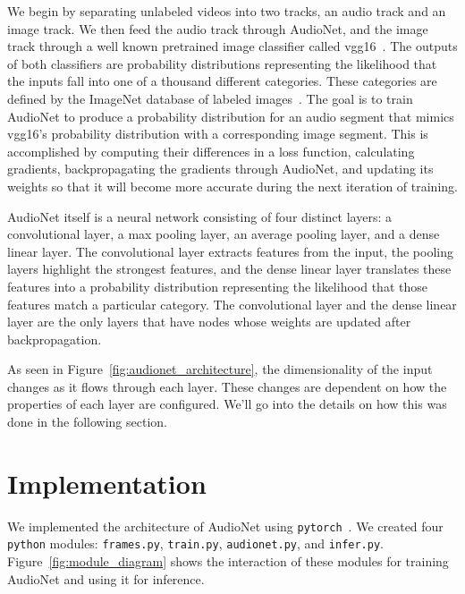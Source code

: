 \documentclass[12pt,twoside]{article}
\theoremstyle{plain}
\theoremstyle{definition}
\theoremstyle{remark}
\begin{document}
We begin by separating unlabeled videos into two tracks, an audio track and an image track.
We then feed the audio track through AudioNet, and the image track through a well known pretrained image classifier called vgg16~\cite{Simonyan:2014}.
The outputs of both classifiers are probability distributions representing the likelihood that the inputs fall into one of a thousand different categories.
These categories are defined by the ImageNet database of labeled images~\cite{Deng:2009}.
The goal is to train AudioNet to produce a probability distribution for an audio segment that mimics vgg16’s probability distribution with a corresponding image segment.
This is accomplished by computing their differences in a loss function, calculating gradients, backpropagating the gradients through AudioNet, and updating its weights so that it will become more accurate during the next iteration of training.

AudioNet itself is a neural network consisting of four distinct layers: a convolutional layer, a max pooling layer, an average pooling layer, and a dense linear layer.
The convolutional layer extracts features from the input, the pooling layers highlight the strongest features, and the dense linear layer translates these features into a probability distribution representing the likelihood that those features match a particular category.
The convolutional layer and the dense linear layer are the only layers that have nodes whose weights are updated after backpropagation.

As seen in Figure~\ref{fig:audionet_architecture}, the dimensionality of the input changes as it flows through each layer.
These changes are dependent on how the properties of each layer are configured.
We’ll go into the details on how this was done in the following section.


\section{Implementation}
\label{sec:implementation}
We implemented the architecture of AudioNet using \texttt{pytorch}~\cite{pytorch}.
We created four \texttt{python} modules: \texttt{frames.py}, \texttt{train.py}, \texttt{audionet.py}, and \texttt{infer.py}.
Figure~\ref{fig:module_diagram} shows the interaction of these modules for training AudioNet and using it for inference.
\end{document}
